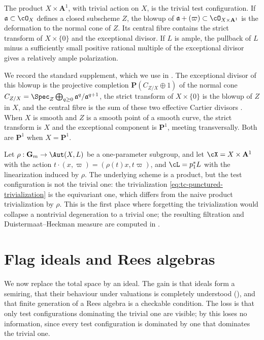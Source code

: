 \begin{example}
\label{ex:product-dnc-test-configurations}
The product $X\times\mathbf A^1$, with trivial action on $X$, is the
trivial test configuration.  If $\mathfrak a\subset\cO_X$ defines a closed
subscheme $Z$, the blowup of
$\mathfrak a+(\varpi)\subset\cO_{X\times\mathbf A^1}$ is the deformation to
the normal cone of $Z$.  Its central fibre contains the strict transform of
$X\times\{0\}$ and the exceptional divisor.  If $L$ is ample, the pullback of $L$ minus a sufficiently small
positive rational multiple of the exceptional divisor gives a relatively
ample polarization.

We record the standard supplement, which we use in
.  The exceptional divisor of this blowup is the
projective completion $\mathbf P(C_{Z/X}\oplus1)$ of the normal cone
$C_{Z/X}=\Spec_Z\bigoplus_{q\geq0}\mathfrak a^q/\mathfrak a^{q+1}$, the
strict transform of $X\times\{0\}$ is the blowup of $Z$ in $X$, and
the central fibre is the sum of these two effective Cartier divisors
\cite[\S1.2]{BJ22}.  When $X$ is smooth and $Z$ is a smooth point of a
smooth curve, the strict transform is $X$ and the exceptional component
is $\mathbf P^1$, meeting transversally.  Both are $\mathbf P^1$ when
$X=\mathbf P^1$.
\end{example}

\begin{example}
\label{ex:ch33-product-nontrivial-action}
Let $\rho:\mathbf G_m\to\Aut(X,L)$ be a one-parameter subgroup, and let
$\cX=X\times\mathbf A^1$ with the action
$t\cdot(x,\varpi)=(\rho(t)x,t\varpi)$, and
$\cL=p_1^\ast L$ with the linearization induced by $\rho$.  The
underlying scheme is a product, but the test configuration is not the
trivial one: the trivialization
\eqref{eq:tc-punctured-trivialization} is the equivariant one, which
differs from the naive product trivialization by $\rho$.  This is the
first place where forgetting the trivialization would collapse a nontrivial
degeneration to a trivial one; the resulting filtration and
Duistermaat--Heckman measure are computed in .
\end{example}

\section{Flag ideals and Rees algebras}
\label{sec:ch33-flag-ideals}

We now replace the total space by an ideal.  The gain is that ideals form a
semiring, that their behaviour under valuations is completely understood
(), and that finite generation of a Rees
algebra is a checkable condition.  The loss is that only test configurations
dominating the trivial one are visible; by
 this loses no information, since every test
configuration is dominated by one that dominates the trivial one.

